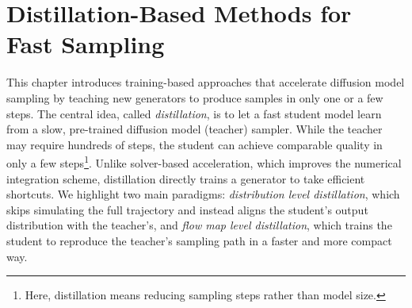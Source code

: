 % 



% 
\chapter{Distillation-Based Methods for Fast Sampling}\label{ch:distillation}

This chapter introduces training-based approaches that accelerate diffusion model sampling by teaching new generators to produce samples in only one or a few steps. The central idea, called \emph{distillation}, is to let a fast student model learn from a slow, pre-trained diffusion model (teacher) sampler. While the teacher may require hundreds of steps, the student can achieve comparable quality in only a few steps\footnote{Here, distillation means reducing sampling steps rather than model size.}. Unlike solver-based acceleration, which improves the numerical integration scheme, distillation directly trains a generator to take efficient shortcuts. We highlight two main paradigms: \emph{distribution level distillation}, which skips simulating the full trajectory and instead aligns the student’s output distribution with the teacher’s, and \emph{flow map level distillation}, which trains the student to reproduce the teacher’s sampling path in a faster and more compact way.







